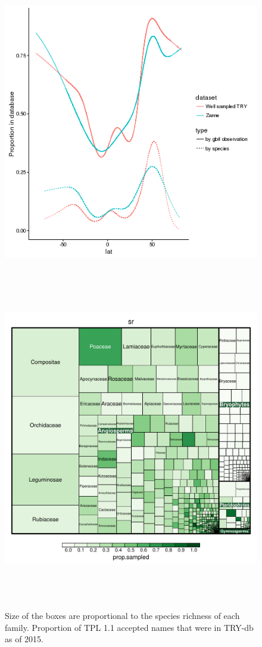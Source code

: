 \documentclass[a4paper,11pt]{article}
\begin{document}
\begin{figure}[h!]
\centering
  \includegraphics[width=\textwidth]{figures/multi_gam_zae_diaz.png}
\end{figure}


\begin{figure}[h!]
\centering
\includegraphics[width=15cm,height=15cm,keepaspectratio]{figures/sampling_in_try_by_family.pdf}
\caption{Size of the boxes are proportional to the species richness of each family.  Proportion of TPL 1.1 accepted names that were in TRY-db as of 2015.  }
\label{fig:try_treemap}
\end{figure}
\clearpage


\end{document}
